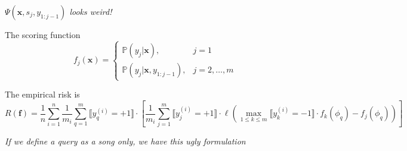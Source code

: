 \documentclass[9pt]{extarticle}
\newcommand{\eat}[1]{}
\newcommand{\llb}{\llbracket}
\newcommand{\rrb}{\rrbracket}
\newcommand{\f}{\mathbf{f}}
\newcommand{\x}{\mathbf{x}}
\newcommand{\1}{\mathbf{1}}
\newcommand{\w}{\mathbf{w}}
\newcommand{\p}{\mathbb{P}}
\newcommand{\pb}[1]{^{({#1})}}
\newcommand{\ie}{i.e.\ }
\begin{document}
{\emph{$\Psi(\x, s_j, y_{1:j-1})$ looks weird!}

The scoring function
$$
f_j(\x) = 
\begin{cases}
\p(y_j |\x), & j=1 \\
\p(y_j |\x, y_{1:j-1}), & j=2,\dots,m
\end{cases}
$$

The empirical risk is
$$
R(\f) 
= \frac{1}{n} \sum_{i=1}^n 
  \frac{1}{m_i} \sum_{q=1}^m \llb y_q\pb{i} = +1 \rrb 
  \cdot \left[
  \frac{1}{m_i} \sum_{j=1}^m 
  \llb y_j\pb{i} = +1 \rrb \cdot \ell \left( \max_{1 \le k \le m} \llb y_k\pb{i} = -1 \rrb \cdot f_k(\phi_q) - f_j(\phi_q) 
  \right) \right]
$$

\emph{If we define a query as a song only, we have this ugly formulation} 
}

\eat{
\subsection{Baselines}

\paragraph{Matrix factorisation}
Let $\phi(s_i)$ be the (hidden) features of song $s_i$, we can construct a $N \times N$ matrix of song co-occurrences (normally very sparse),
the missing entries can be recovered by factorising this matrix into two low rank matrices.
The scoring function of this approach is $f(q, s_i) = \phi(q)^\top \phi(s_i)$.

\paragraph{Logistic regression}
We can model the probability of song $s_i$ in a playlist induced by query $q$ using logistic regression,
\ie the scoring function is $f(q, s_i) = \sigma(\w^\top \Psi(q, s_i))$ where $\sigma(z) = \frac{1}{1+\exp(-z)}$ is the logistic function.
To estimate the model parameters $\w$, for each observed playlist, we derive a set of positive examples $\{((q, s_j), +1)\}$ and 
a set of negative examples $\{(q, s_k), -1)\}$ where $s_j$ are song in the playlist and $s_k$ are songs not in it.

}
\end{document}
